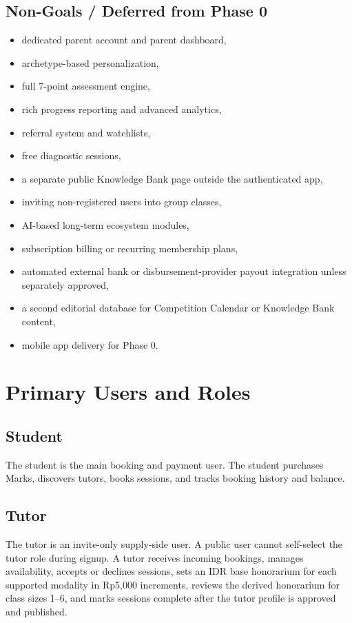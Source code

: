 \documentclass[11pt,a4paper]{article}
\begin{document}
\subsection{Non-Goals / Deferred from Phase 0}
\begin{itemize}
	\item dedicated parent account and parent dashboard,
	\item archetype-based personalization,
	\item full 7-point assessment engine,
	\item rich progress reporting and advanced analytics,
	\item referral system and watchlists,
	\item free diagnostic sessions,
\item a separate public Knowledge Bank page outside the authenticated app,
	\item inviting non-registered users into group classes,
	\item AI-based long-term ecosystem modules,
	\item subscription billing or recurring membership plans,
	\item automated external bank or disbursement-provider payout integration unless separately approved,
\item a second editorial database for Competition Calendar or Knowledge Bank content,
	\item mobile app delivery for Phase 0.
\end{itemize}

\section{Primary Users and Roles}

\subsection{Student}
The student is the main booking and payment user. The student purchases Marks, discovers tutors, books sessions, and tracks booking history and balance.

\subsection{Tutor}
The tutor is an invite-only supply-side user. A public user cannot self-select the tutor role during signup. A tutor receives incoming bookings, manages availability, accepts or declines sessions, sets an IDR base honorarium for each supported modality in Rp5,000 increments, reviews the derived honorarium for class sizes 1--6, and marks sessions complete after the tutor profile is approved and published.
\end{document}
